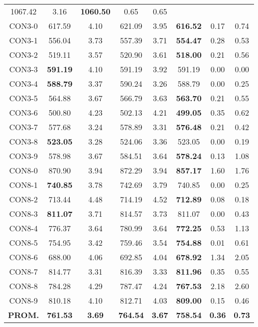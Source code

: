 \begin{table}[h]
\begin{tabular}{c c c c c c c c}
1067.42 & 3.16 & \bf{1060.50} & 
0.65 & 0.65\\CON3-0 & 617.59 & 4.10 & 
621.09 & 3.95 & \bf{616.52} & 
0.17 & 0.74\\CON3-1 & 556.04 & 3.73 & 
557.39 & 3.71 & \bf{554.47} & 
0.28 & 0.53\\CON3-2 & 519.11 & 3.57 & 
520.90 & 3.61 & \bf{518.00} & 
0.21 & 0.56\\CON3-3 & \bf{591.19} & 4.10 & 
591.19 & 3.92 & 591.19 & 0.00
 & 0.00\\CON3-4 & \bf{588.79} & 3.37 & 
590.24 & 3.26 & 588.79 & 0.00
 & 0.25\\CON3-5 & 564.88 & 3.67 & 
566.79 & 3.63 & \bf{563.70} & 
0.21 & 0.55\\CON3-6 & 500.80 & 4.23 & 
502.13 & 4.21 & \bf{499.05} & 
0.35 & 0.62\\CON3-7 & 577.68 & 3.24 & 
578.89 & 3.31 & \bf{576.48} & 
0.21 & 0.42\\CON3-8 & \bf{523.05} & 3.28 & 
524.06 & 3.36 & 523.05 & 0.00
 & 0.19\\CON3-9 & 578.98 & 3.67 & 
584.51 & 3.64 & \bf{578.24} & 
0.13 & 1.08\\CON8-0 & 870.90 & 3.94 & 
872.29 & 3.94 & \bf{857.17} & 
1.60 & 1.76\\CON8-1 & \bf{740.85} & 3.78 & 
742.69 & 3.79 & 740.85 & 0.00
 & 0.25\\CON8-2 & 713.44 & 4.48 & 
714.19 & 4.52 & \bf{712.89} & 
0.08 & 0.18\\CON8-3 & \bf{811.07} & 3.71 & 
814.57 & 3.73 & 811.07 & 0.00
 & 0.43\\CON8-4 & 776.37 & 3.64 & 
780.99 & 3.64 & \bf{772.25} & 
0.53 & 1.13\\CON8-5 & 754.95 & 3.42 & 
759.46 & 3.54 & \bf{754.88} & 
0.01 & 0.61\\CON8-6 & 688.00 & 4.06 & 
692.85 & 4.04 & \bf{678.92} & 
1.34 & 2.05\\CON8-7 & 814.77 & 3.31 & 
816.39 & 3.33 & \bf{811.96} & 
0.35 & 0.55\\CON8-8 & 784.28 & 4.29 & 
787.47 & 4.24 & \bf{767.53} & 
2.18 & 2.60\\CON8-9 & 810.18 & 4.10 & 
812.71 & 4.03 & \bf{809.00} & 
0.15 & 0.46\\\bf{PROM.} & 
\bf{761.53} & \bf{3.69} & \bf{764.54} & \bf{3.67} & \bf{758.54} & \bf{0.36} & \bf{0.73}\\[1ex]\hline
\end{tabular}
\label{table:nonlin}
\end{table}
